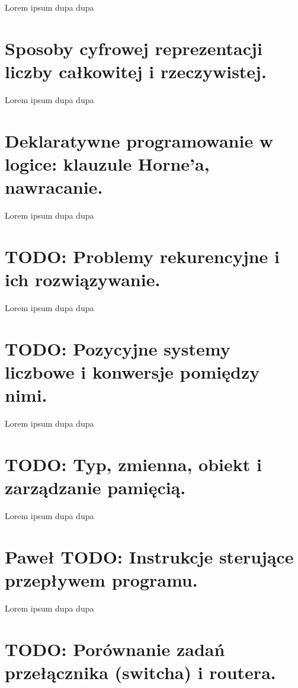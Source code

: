\documentclass[a4paper,12pt,oneside]{book}
\begin{document}
				Lorem ipsum dupa dupa
		
		\setcounter{section}{5}
		\section{Sposoby cyfrowej reprezentacji liczby całkowitej i rzeczywistej.}
				
				Lorem ipsum dupa dupa
		
		\setcounter{section}{52}
		\section{Deklaratywne programowanie w logice: klauzule Horne'a, nawracanie.}
				
				Lorem ipsum dupa dupa
				
		\setcounter{section}{2}
		\section{\color{red} TODO: Problemy rekurencyjne i ich rozwiązywanie. }
		    
		    Lorem ipsum dupa dupa
		
		\setcounter{section}{4}
		\section{\color{red} TODO: Pozycyjne systemy liczbowe i konwersje pomiędzy nimi. }
		    
		    Lorem ipsum dupa dupa
		
		\setcounter{section}{6}
		\section{\color{red} TODO: Typ, zmienna, obiekt i zarządzanie pamięcią. }
		    
		    Lorem ipsum dupa dupa
		
		\setcounter{section}{7}
		\section{\color{green}Paweł \color{red} TODO: Instrukcje sterujące przepływem programu. }
		    
		    Lorem ipsum dupa dupa
		
		\setcounter{section}{10}
		\section{\color{red} TODO: Porównanie zadań przełącznika (switcha) i routera. }
		    
\end{document}
